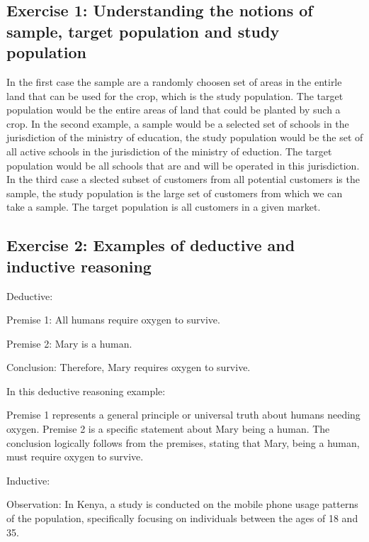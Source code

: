\documentclass[letterpaper,10pt,english]{jupyterBook}
\begin{document}
\subsection{Exercise 1: Understanding the notions of sample, target population and study population}
\label{\detokenize{exercises_unit_3:exercise-1-understanding-the-notions-of-sample-target-population-and-study-population}}
\sphinxAtStartPar
In the first case the sample are a randomly choosen set of areas in the entirle land that can be used for the crop, which is the study population. The target population would be the entire areas of land that could be planted by such a crop. In the second example, a sample would be a selected set of schools in the jurisdiction of the ministry of education, the study population would be the set of all active schools in the jurisdiction of the ministry of eduction. The target population would be all schools that are and will be operated in this jurisdiction. In the third case a slected subset of customers from all potential customers is the sample, the study population is the large set of customers from which we can take a sample. The target population is all customers in a given market.


\subsection{Exercise 2: Examples of deductive and inductive reasoning}
\label{\detokenize{exercises_unit_3:exercise-2-examples-of-deductive-and-inductive-reasoning}}
\sphinxAtStartPar
Deductive:

\sphinxAtStartPar
Premise 1: All humans require oxygen to survive.

\sphinxAtStartPar
Premise 2: Mary is a human.

\sphinxAtStartPar
Conclusion: Therefore, Mary requires oxygen to survive.

\sphinxAtStartPar
In this deductive reasoning example:

\sphinxAtStartPar
Premise 1 represents a general principle or universal truth about humans needing oxygen.
Premise 2 is a specific statement about Mary being a human.
The conclusion logically follows from the premises, stating that Mary, being a human, must require oxygen to survive.

\sphinxAtStartPar
Inductive:

\sphinxAtStartPar
Observation: In Kenya, a study is conducted on the mobile phone usage patterns of the population, specifically focusing on individuals between the ages of 18 and 35.
\end{document}
